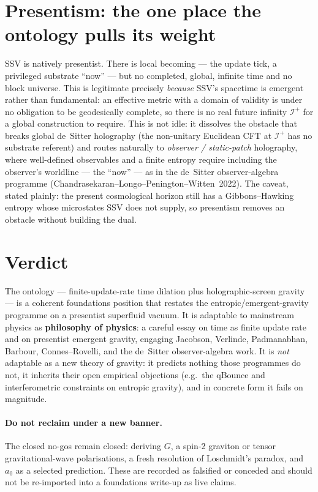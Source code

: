 \documentclass[11pt]{article}
\begin{document}
\section{Presentism: the one place the ontology pulls its weight}

SSV is natively presentist. There is local becoming --- the update tick, a
privileged substrate ``now'' --- but no completed, global, infinite time and no
block universe. This is legitimate precisely \emph{because} SSV's spacetime is
emergent rather than fundamental: an effective metric with a domain of validity
is under no obligation to be geodesically complete, so there is no real
future infinity $\mathcal{I}^+$ for a global construction to require. This is not
idle: it dissolves the obstacle that breaks global de~Sitter holography
(the non-unitary Euclidean CFT at $\mathcal{I}^+$ has no substrate referent) and
routes naturally to \emph{observer / static-patch} holography, where well-defined
observables and a finite entropy require including the observer's worldline ---
the ``now'' --- as in the de~Sitter observer-algebra programme
(Chandrasekaran--Longo--Penington--Witten~2022). The caveat, stated plainly: the
present cosmological horizon still has a Gibbons--Hawking entropy whose
microstates SSV does not supply, so presentism removes an obstacle without
building the dual.

\section{Verdict}

\begin{resultbox}
\noindent The ontology --- finite-update-rate time dilation plus
holographic-screen gravity --- is a coherent foundations position that restates
the entropic/emergent-gravity programme on a presentist superfluid vacuum. It is
adaptable to mainstream physics as \textbf{philosophy of physics}: a careful
essay on time as finite update rate and on presentist emergent gravity, engaging
Jacobson, Verlinde, Padmanabhan, Barbour, Connes--Rovelli, and the de~Sitter
observer-algebra work. It is \emph{not} adaptable as a new theory of gravity: it
predicts nothing those programmes do not, it inherits their open empirical
objections (e.g.\ the qBounce and interferometric constraints on entropic
gravity), and in concrete form it fails on magnitude.
\end{resultbox}

\paragraph{Do not reclaim under a new banner.} The closed no-gos remain closed:
deriving $G$, a spin-2 graviton or tensor gravitational-wave polarisations, a
fresh resolution of Loschmidt's paradox, and $a_0$ as a selected prediction.
These are recorded as falsified or conceded and should not be re-imported into a
foundations write-up as live claims.
\end{document}
